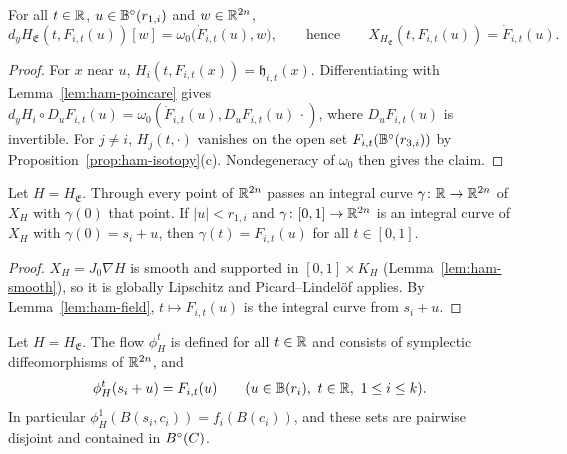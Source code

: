 \begin{lemma}\label{lem:ham-field}
For all $t\in\mathbb{R}$, $u\in\mathbb{B}^\circ(r_{1,i})$ and $w\in\mathbb{R}^{2n}$,
\[
 d_yH_{\mathfrak E}(t,F_{i,t}(u))[w]=\omega_0\big(\dot F_{i,t}(u),w\big),\qquad\text{hence}\qquad
 X_{H_{\mathfrak E}}(t,F_{i,t}(u))=\dot F_{i,t}(u).
\]
\end{lemma}

\begin{proof}
For $x$ near $u$, $H_i(t,F_{i,t}(x))=\mathfrak h_{i,t}(x)$. Differentiating with Lemma~\ref{lem:ham-poincare} gives $d_yH_i\circ D_uF_{i,t}(u)=\omega_0(\dot F_{i,t}(u),D_uF_{i,t}(u)\,\cdot)$, where $D_uF_{i,t}(u)$ is invertible. For $j\ne i$, $H_j(t,\cdot)$ vanishes on the open set $F_{i,t}(\mathbb{B}^\circ(r_{3,i}))$ by Proposition~\ref{prop:ham-isotopy}(c). Nondegeneracy of $\omega_0$ then gives the claim.
\end{proof}

\begin{lemma}\label{lem:ham-curves}
Let $H=H_{\mathfrak E}$. Through every point of $\mathbb{R}^{2n}$ passes an integral curve $\gamma\colon\mathbb{R}\to\mathbb{R}^{2n}$ of $X_H$ with
$\gamma(0)$ that point. If $|u|<r_{1,i}$ and $\gamma\colon[0,1]\to\mathbb{R}^{2n}$ is an integral curve of $X_H$ with
$\gamma(0)=s_i+u$, then $\gamma(t)=F_{i,t}(u)$ for all $t\in[0,1]$.
\end{lemma}

\begin{proof}
$X_H=J_0\nabla H$ is smooth and supported in $[0,1]\times K_H$ (Lemma~\ref{lem:ham-smooth}), so it is globally Lipschitz and Picard--Lindel\"of applies. By Lemma~\ref{lem:ham-field}, $t\mapsto F_{i,t}(u)$ is the integral curve from $s_i+u$.
\end{proof}

\begin{theorem}\label{thm:ham-flow}
Let $H=H_{\mathfrak E}$. The flow $\phi^t_H$ is defined for all $t\in\mathbb{R}$ and consists of symplectic diffeomorphisms of
$\mathbb{R}^{2n}$, and
\[
 \phi^t_H(s_i+u)=F_{i,t}(u)\qquad(u\in\EB(r_i),\ t\in\R,\ 1\le i\le k).
\]
In particular $\phi^1_H(B(s_i,c_i))=f_i(B(c_i))$, and these sets are pairwise disjoint and contained in $B^{\circ}(C)$.
\end{theorem}

